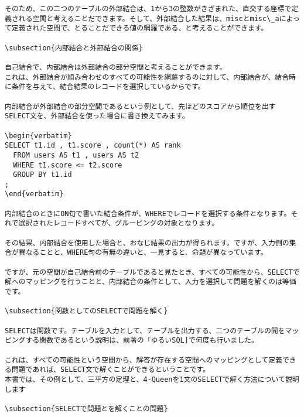 \begin{lstlisting}[caption=自己結合の外部結合の例,label=sql:outer]
そのため、この二つのテーブルの外部結合は、1から3の整数がきざまれた、直交する座標で定義される空間と考えることだできます。そして、外部結合した結果は、miscとmisc\_aによって定義された空間で、とることだできる値の網羅である、と考えることができます。

\subsection{内部結合と外部結合の関係}

自己結合で、内部結合は外部結合の部分空間と考えることができます。
これは、外部結合が組み合わせのすべての可能性を網羅するのに対して、内部結合が、結合時に条件を与えて、結合結果のレコードを選択しているからです。

内部結合が外部結合の部分空間であるという例として、先ほどのスコアから順位を出すSELECT文を、外部結合を使った場合に書き換えてみます。

\begin{verbatim}
SELECT t1.id , t1.score , count(*) AS rank
  FROM users AS t1 , users AS t2
  WHERE t1.score <= t2.score
  GROUP BY t1.id
;
\end{verbatim}

内部結合のときにON句で書いた結合条件が、WHEREでレコードを選択する条件となります。それで選択されたレコードすべてが、グルーピングの対象となります。

その結果、内部結合を使用した場合と、おなじ結果の出力が得られます。ですが、入力側の集合が異なることと、WHERE句の有無の違いと、一見すると、命題が異なっています。

ですが、元の空間が自己結合前のテーブルであると見たとき、すべての可能性から、SELECTで解へのマッピングを行うことと、内部結合の条件として、入力を選択して問題を解くのは等価です。

\subsection{関数としてのSELECTで問題を解く}

SELECTは関数です。テーブルを入力として、テーブルを出力する、二つのテーブルの間をマッピングする関数であるという説明は、前著の「ゆるいSQL]で何度も行いました。

これは、すべての可能性という空間から、解答が存在する空間へのマッピングとして定義できる問題であれば、SELECT文で解くことができるということです。
本書では、その例として、三平方の定理と、4-Queenを1文のSELECTで解く方法について説明します

\subsection{SELECTで問題とを解くことの問題}


\end{lstlisting}
